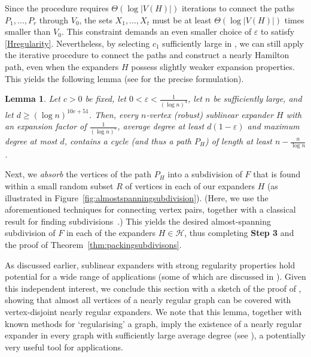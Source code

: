\documentclass[10pt]{article}
\theoremstyle{plain}
\numberwithin{theorem}{section}
\newtheorem{lemma}[theorem]{Lemma}
\theoremstyle{definition}
\theoremstyle{remark}
\newcommand{\cH}{\mathcal{H}}
\newcommand{\eps}{\varepsilon}
\theoremstyle{plain}
\begin{document}
Since the procedure requires $\Theta(\log |V(H)|)$ iterations to connect the paths $P_1, \ldots, P_r$ through $V_0$, the sets $X_1, \ldots, X_t$ must be at least $\Theta(\log |V(H)|)$ times smaller than $V_0$. This constraint demands an even smaller choice of $\eps$ to satisfy \ref{Hregularity}. Nevertheless, by selecting $c_1$ sufficiently large in , we can still apply the iterative procedure to connect the paths and construct a nearly Hamilton path, even when the expanders $H$ possess slightly weaker expansion properties. This yields the following lemma (see  for the precise formulation).

\begin{lemma}
\label{nearly Ham informal}
Let $c > 0$ be fixed, let $0 < \eps < \frac{1}{(\log n)^4}$, let $n$ be sufficiently large, and let $d \geq (\log n)^{10c+51}$. Then, every $n$-vertex (robust) sublinear expander $H$ with an expansion factor of $\frac{1}{(\log n)^c}$, average degree at least $d(1-\eps)$ and maximum degree at most $d$, contains a cycle (and thus a path $P_H$) of length at least $n - \frac{n}{\log n}$.  
\end{lemma}


Next, we \emph{absorb} the vertices of the path $P_H$ into a subdivision of $F$ that is found within a small random subset $R$ of vertices in each of our expanders $H$ (as illustrated in Figure~\ref{fig:almostspanningsubdivision}). (Here, we use the aforementioned techniques for connecting vertex pairs, together with a classical result for finding subdivisions~\cite{bollobas1998proof, komlos1996topological}.) This yields the desired almost-spanning subdivision of $F$ in each of the expanders $H \in \cH$, thus completing \textbf{Step 3} and the proof of Theorem~\ref{thm:packingsubdivisons}.

As discussed earlier, sublinear expanders with strong regularity properties hold potential for a wide range of applications (some of which are discussed in ). Given this independent interest, we conclude this section with a sketch of the proof of , showing that almost all vertices of a nearly regular graph can be covered with vertex-disjoint nearly regular expanders.
We note that this lemma, together with known methods for `regularising' a graph, imply the existence of a nearly regular expander in every graph with sufficiently large average degree (see ), a potentially very useful tool for applications.
\end{document}
